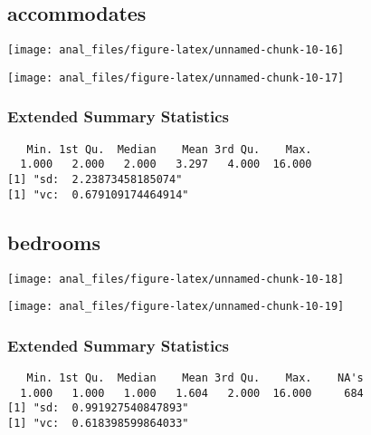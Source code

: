\hypertarget{accommodates}{%
\subsection{accommodates}\label{accommodates}}

\begin{center}\texttt{[image: anal\_files/figure-latex/unnamed-chunk-10-16]} \end{center}

\begin{center}\texttt{[image: anal\_files/figure-latex/unnamed-chunk-10-17]} \end{center}

\hypertarget{extended-summary-statistics-1}{%
\subsubsection{Extended Summary
Statistics}\label{extended-summary-statistics-1}}

\begin{verbatim}   Min. 1st Qu.  Median    Mean 3rd Qu.    Max. 
  1.000   2.000   2.000   3.297   4.000  16.000 
[1] "sd:  2.23873458185074"
[1] "vc:  0.679109174464914"
\end{verbatim}

\pagebreak

\hypertarget{bedrooms}{%
\subsection{bedrooms}\label{bedrooms}}

\begin{center}\texttt{[image: anal\_files/figure-latex/unnamed-chunk-10-18]} \end{center}

\begin{center}\texttt{[image: anal\_files/figure-latex/unnamed-chunk-10-19]} \end{center}

\hypertarget{extended-summary-statistics-2}{%
\subsubsection{Extended Summary
Statistics}\label{extended-summary-statistics-2}}

\begin{verbatim}   Min. 1st Qu.  Median    Mean 3rd Qu.    Max.    NA's 
  1.000   1.000   1.000   1.604   2.000  16.000     684 
[1] "sd:  0.991927540847893"
[1] "vc:  0.618398599864033"
\end{verbatim}

